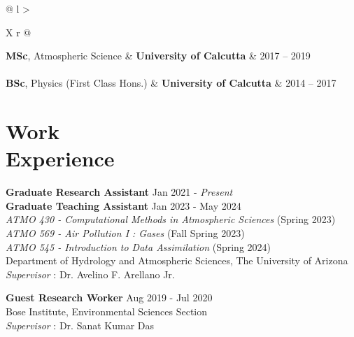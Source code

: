 \documentclass[margin,line]{resume}
\begin{document}
\begin{resume}
\begin{tabularx}{\linewidth}{@{} l >{\raggedright\arraybackslash}X r @{}}
	\textbf{MSc}, Atmospheric Science & \textbf{University of Calcutta} & 2017 -- 2019 \\
	 \\[1.5ex]
	
	\textbf{BSc}, Physics (First Class Hons.) & \textbf{University of Calcutta} & 2014 -- 2017 \\
\end{tabularx}
\vspace*{-2mm} %
		
		\vspace*{-3mm}
		
		\section{\mysidestyle \textbf{\textcolor{sep}{Work \\Experience}}}
		
		\textbf{Graduate Research Assistant} \hfill Jan 2021 - \textit{Present}  \\
		\textbf{Graduate Teaching Assistant} \hfill Jan 2023 - May 2024  \\
		\hspace*{2mm} \textit{ATMO 430 - Computational Methods in Atmospheric Sciences} (Spring 2023) \\
		\hspace*{2mm}  \textit{ATMO 569 - Air Pollution I : Gases} (Fall Spring 2023) \\
		\hspace*{2mm}  \textit{ATMO 545 - Introduction to Data Assimilation} (Spring 2024) \\
		Department of Hydrology and Atmospheric Sciences, The University of Arizona \\
		\textit{ Supervisor} : Dr. Avelino F. Arellano Jr.
		
		\textbf{Guest Research Worker} \hfill Aug 2019 - Jul 2020 \\
		Bose Institute, Environmental Sciences Section \\
		\textit{Supervisor} : Dr. Sanat Kumar Das 
		

\end{resume}
\end{document}
